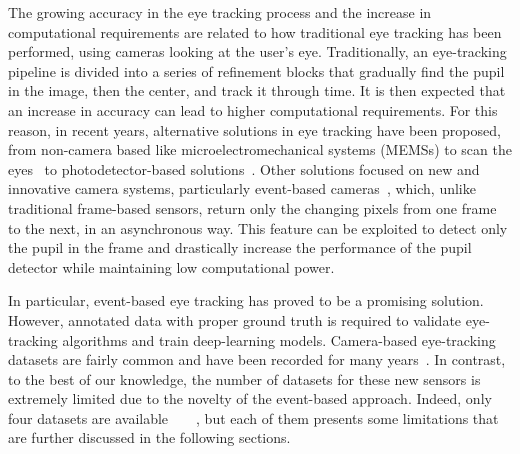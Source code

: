 The growing accuracy in the eye tracking process and the increase in computational requirements are related to how traditional eye tracking has been performed, using cameras looking at the user's eye. Traditionally, an eye-tracking pipeline is divided into a series of refinement blocks that gradually find the pupil in the image, then the center, and track it through time. It is then expected that an increase in accuracy can lead to higher computational requirements. For this reason, in recent years, alternative solutions in eye tracking have been proposed, from non-camera based like microelectromechanical systems (MEMSs) to scan the eyes~\cite{zafar2023investigation} to photodetector-based solutions~\cite{crafa2024towards}. Other solutions focused on new and innovative camera systems, particularly event-based cameras~\cite{gallego2020event}, which, unlike traditional frame-based sensors, return only the changing pixels from one frame to the next, in an asynchronous way. This feature can be exploited to detect only the pupil in the frame and drastically increase the performance of the pupil detector while maintaining low computational power.

 

In particular, event-based eye tracking has proved to be a promising solution. However, annotated data with proper ground truth is required to validate eye-tracking algorithms and train deep-learning models. Camera-based eye-tracking datasets are fairly common and have been recorded for many years~\cite{winkler2013overview}. In contrast, to the best of our knowledge, the number of datasets for these new sensors is extremely limited due to the novelty of the event-based approach. Indeed, only four datasets are available~\cite{angelopoulos2020event}~\cite{bonazzi2024retina}~\cite{wang2024eventbasedeyetrackingais}~\cite{eveyepaper}, but each of them presents some limitations that are further discussed in the following sections.

\begin{comment}Indeed, only two datasets are available~\cite{angelopoulos2020event}~\cite{bonazzi2024retina}. A third one exists ~\cite{wang2024eventbasedeyetrackingais}, yet was collected without IR-pass filter so it contains events of object reflections mixed with eye movements.

In Angelopoulos, the dataset has limited ground truth, due to the difficulties in generating a pupil-level annotation from the sparse event data. Indeed, Angelopoulos's dataset provides as ground truth the looked point on a screen, not the pupil position in the image frame. This type of annotation has been widely used for many years in the eye-tracking field~\cite{holmqvist_eye_movements} but introduces additional calibration and nonlinearities in the system, which makes a proper evaluation of the pure pupil detection and tracking algorithm less accurate.
\end{comment}

